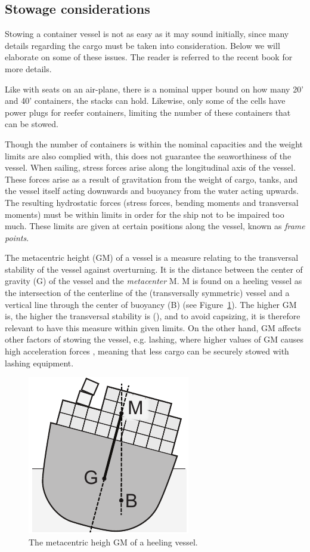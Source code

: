 \subsection{Stowage considerations}
Stowing a container vessel is not as easy as it may sound initially, since many details regarding the cargo must be taken into consideration.
Below we will elaborate on some of these issues. The reader is referred to the recent book \cite{JPAV18} for more details.

Like with seats on an air-plane, there is a nominal upper bound on how many 20' and 40' containers, the stacks can hold. Likewise, only some of the cells have power plugs for reefer containers, limiting the number of these containers that can be stowed. 

Though the number of containers is within the nominal capacities and the weight limits are also complied with, this does not guarantee the  seaworthiness of the vessel. When sailing, stress forces arise along the longitudinal axis of the vessel. These forces arise as a result of gravitation from the weight of cargo, tanks, and the vessel itself acting downwards and buoyancy from the water acting upwards. The resulting hydrostatic forces (stress forces, bending moments and transversal moments) must be within limits in order for the ship not to be impaired too much. These limits are given at certain positions along the vessel, known as \emph{frame points}. 

The metacentric height (GM) of a vessel is a measure relating to the transversal stability of the vessel against overturning. It is the distance between the center of gravity (G) of the vessel and the \emph{metacenter} M. M is found on a heeling vessel as the intersection of the centerline of the (transversally symmetric) vessel and a vertical line through the center of buoyancy (B) (see Figure~\ref{fig:GM}). The higher GM is, the higher the transversal stability is (\cite{JPAV18}), and to avoid capsizing, it is therefore relevant to have this measure within given limits. 
On the other hand, GM affects other factors of stowing the vessel, e.g. lashing, where {higher} values of GM causes high acceleration forces , meaning that less cargo can be securely stowed with lashing equipment. 

\begin{figure}
	\centering
		\includegraphics[scale=0.7]{figures/GM.pdf}
	\caption{The metacentric heigh GM of a heeling vessel.}
	\label{fig:GM}
\end{figure}

